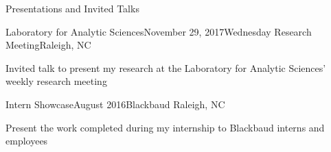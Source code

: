\documentclass{resume} %
\begin{document}
\begin{rSection}{Presentations and Invited Talks}
\begin{rSubsection}{Laboratory for Analytic Sciences}{November 29, 2017}{Wednesday Research Meeting}{Raleigh, NC}
\item Invited talk to present my research at the Laboratory for Analytic Sciences' weekly research meeting
\end{rSubsection}
\vspace{-5pt}

\begin{rSubsection}{Intern Showcase}{August 2016}{Blackbaud }{Raleigh, NC}
\item Present the work completed during my internship to Blackbaud interns and employees
\end{rSubsection}

\end{rSection}
\vspace{-10pt}
\end{document}
